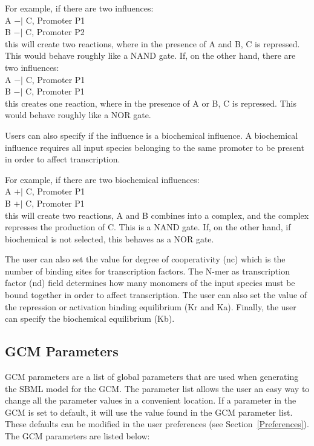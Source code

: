 \documentclass[titlepage,11pt]{article}
\begin{document}
For example, if there are two influences:\\
A $-|$ C, Promoter P1\\
B $-|$ C, Promoter P2\\
this will create two reactions, where in the presence of A and
B, C is repressed.  This would behave roughly like a NAND gate. 
If, on the other hand, there are two influences:\\
A $-|$ C, Promoter P1\\
B $-|$ C, Promoter P1\\
this creates one reaction, where in the presence of A or
B, C is repressed.  This would behave roughly like a NOR gate.

Users can also specify if the influence is a biochemical
influence.  A biochemical influence requires all input species
belonging to the same promoter to be present in order to affect
transcription. 

For example, if there are two biochemical influences:\\
A $+|$ C, Promoter P1\\
B $+|$ C, Promoter P1\\
this will create two reactions, A and B combines into a
complex, and the complex represses the production of C. This is a
NAND gate. If, on the other hand, if biochemical is not selected,
this behaves as a NOR gate.

The user can also set the value for degree of cooperativity (nc) 
which is the number of binding sites for transcription factors. 
The N-mer as transcription factor (nd) field determines how many 
monomers of the input species
must be bound together in order to affect transcription.  The user
can also set the value of the repression or activation binding equilibrium
(Kr and Ka).  Finally, the user can specify the biochemical equilibrium
(Kb).

\subsection{\label{GCMParameters}GCM Parameters}

\noindent
GCM parameters are a list of global parameters that are used
when generating the SBML model for the GCM.  The parameter list
allows the user an easy way to change all the parameter values in
a convenient location.  If a parameter in the GCM is set to
default, it will use the value found in the GCM parameter list.  
These defaults can be modified in the user preferences
(see Section~\ref{Preferences}).  The GCM parameters are listed below:
\end{document}
